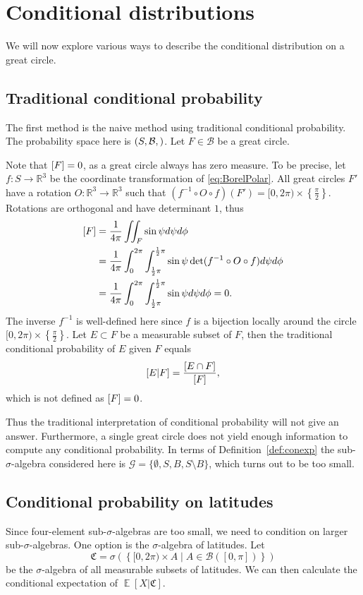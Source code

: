 \documentclass[a4paper]{report}
\theoremstyle{plain}
\theoremstyle{definition}
\theoremstyle{remark}
\numberwithin{equation}{chapter}
\newcommand{\R}{\mathbb{R}}
\let\P\relax
\DeclareMathOperator{\P}{\mathbb{P}}
\DeclareMathOperator{\E}{\mathbb{E}}
\DeclareMathOperator{\1}{\mathbbm{1}}
\renewcommand{\G}{\mathcal{G}}
\newcommand{\B}{\mathcal{B}}
\begin{document}
\section{Conditional distributions}
We will now explore various ways to describe the conditional distribution on a great circle.
\subsection{Traditional conditional probability}\label{sec:BorelNaive}
The first method is the naive method using traditional conditional probability. The probability space here is $(S,\B,\P)$. Let $F\in\B$ be a great circle.

Note that $\P[F]=0$, as a great circle always has zero measure. To be precise, let $f\colon S\to\R^3$ be the coordinate transformation of \eqref{eq:BorelPolar}. All great circles $F'$ have a rotation $O\colon\R^3\to\R^3$ such that $(f^{-1}\circ O\circ f)(F')=[0,2\pi)\times\left\{\frac{\pi}{2}\right\}$. Rotations are orthogonal and have determinant $1$, thus
\begin{align}
\P[F]&=\frac{1}{4\pi}\iint_F\sin\psi d\psi d\phi\\
&=\frac{1}{4\pi}\int_0^{2\pi}\int_{\frac{1}{2}\pi}^{\frac{1}{2}\pi}\sin\psi \det(f^{-1}\circ O\circ f)d\psi d\phi\\
&=\frac{1}{4\pi}\int_0^{2\pi}\int_{\frac{1}{2}\pi}^{\frac{1}{2}\pi}\sin\psi d\psi d\phi=0.
\end{align}
The inverse $f^{-1}$ is well-defined here since $f$ is a bijection locally around the circle $[0,2\pi)\times\left\{\frac{\pi}{2}\right\}$. Let $E\subset F$ be a measurable subset of $F$, then the traditional conditional probability of $E$ given $F$ equals
\begin{equation}
\P[E|F]=\frac{\P[E\cap F]}{\P[F]},
\end{equation}
which is not defined as $\P[F]=0$.

Thus the traditional interpretation of conditional probability will not give an answer. Furthermore, a single great circle does not yield enough information to compute any conditional probability. In terms of Definition~\ref{def:conexp} the sub-$\sigma$-algebra considered here is $\G=\{\emptyset,S,B,S\setminus B\}$, which turns out to be too small.

\subsection{Conditional probability on latitudes}\label{sec:BorelLong}
Since four-element sub-$\sigma$-algebras are too small, we need to condition on larger sub-$\sigma$-algebras. One option is the $\sigma$-algebra of latitudes. Let
\begin{equation}
\mathfrak{C}=\sigma\left(\left\{[0,2\pi)\times A\mid A\in\B([0,\pi])\right\}\right)
\end{equation}
be the $\sigma$-algebra of all measurable subsets of latitudes. We can then calculate the conditional expectation of $\E[X|\mathfrak{C}]$.
\end{document}
